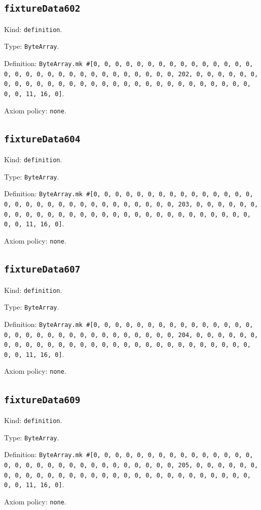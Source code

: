 \documentclass[11pt]{article}
\begin{document}
\subsection*{\texttt{fixtureData602}}
\noindent Kind: \texttt{definition}.\par
\noindent Type: \texttt{ByteArray}.\par
\noindent Definition: \texttt{ByteArray.mk \#[0, 0, 0, 0, 0, 0, 0, 0, 0, 0, 0, 0, 0, 0, 0, 0, 0, 0, 0, 0, 0, 0, 0, 0, 0, 0, 0, 0, 0, 0, 0, 202, 0, 0, 0, 0, 0, 0, 0, 0, 0, 0, 0, 0, 0, 0, 0, 0, 0, 0, 0, 0, 0, 0, 0, 0, 0, 0, 0, 0, 0, 0, 0, 11, 16, 0]}.\par
\noindent Axiom policy: \texttt{none}.\par
\subsection*{\texttt{fixtureData604}}
\noindent Kind: \texttt{definition}.\par
\noindent Type: \texttt{ByteArray}.\par
\noindent Definition: \texttt{ByteArray.mk \#[0, 0, 0, 0, 0, 0, 0, 0, 0, 0, 0, 0, 0, 0, 0, 0, 0, 0, 0, 0, 0, 0, 0, 0, 0, 0, 0, 0, 0, 0, 0, 203, 0, 0, 0, 0, 0, 0, 0, 0, 0, 0, 0, 0, 0, 0, 0, 0, 0, 0, 0, 0, 0, 0, 0, 0, 0, 0, 0, 0, 0, 0, 0, 11, 16, 0]}.\par
\noindent Axiom policy: \texttt{none}.\par
\subsection*{\texttt{fixtureData607}}
\noindent Kind: \texttt{definition}.\par
\noindent Type: \texttt{ByteArray}.\par
\noindent Definition: \texttt{ByteArray.mk \#[0, 0, 0, 0, 0, 0, 0, 0, 0, 0, 0, 0, 0, 0, 0, 0, 0, 0, 0, 0, 0, 0, 0, 0, 0, 0, 0, 0, 0, 0, 0, 204, 0, 0, 0, 0, 0, 0, 0, 0, 0, 0, 0, 0, 0, 0, 0, 0, 0, 0, 0, 0, 0, 0, 0, 0, 0, 0, 0, 0, 0, 0, 0, 11, 16, 0]}.\par
\noindent Axiom policy: \texttt{none}.\par
\subsection*{\texttt{fixtureData609}}
\noindent Kind: \texttt{definition}.\par
\noindent Type: \texttt{ByteArray}.\par
\noindent Definition: \texttt{ByteArray.mk \#[0, 0, 0, 0, 0, 0, 0, 0, 0, 0, 0, 0, 0, 0, 0, 0, 0, 0, 0, 0, 0, 0, 0, 0, 0, 0, 0, 0, 0, 0, 0, 205, 0, 0, 0, 0, 0, 0, 0, 0, 0, 0, 0, 0, 0, 0, 0, 0, 0, 0, 0, 0, 0, 0, 0, 0, 0, 0, 0, 0, 0, 0, 0, 11, 16, 0]}.\par
\noindent Axiom policy: \texttt{none}.\par
\end{document}
